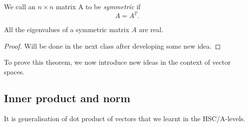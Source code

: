 \begin{definition}
	We call an \( n \times n \) matrix A to be \emph{symmetric} if
	\begin{equation}
		A = A^T.
		\label{eq:symmetric-matrix-1}
	\end{equation}
\end{definition}

\begin{theorem}\label{thm:eigsofsymmatrix}
	All the eigenvalues of a symmetric matrix \( A \) are real.
\end{theorem}
\begin{proof}
	Will be done in the next class after developing some new idea.
\end{proof}

To prove this theorem, we now introduce new ideas in the context of vector spaces.

\subsection{Inner product and norm}
It is generalisation of dot product of vectors that we learnt in the HSC/A-levels.

